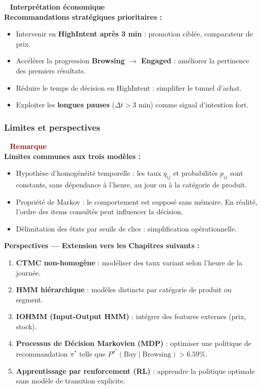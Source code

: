 \documentclass[11pt,a4paper]{article}
\newenvironment{insightbox}{%
  \vspace{3pt}\begin{framed}
  \noindent{\color{NavyBlue}\rule{0.3cm}{3pt}}~%
  \textcolor{NavyBlue}{\textbf{Interprétation économique}}\\[3pt]}
  {\end{framed}\vspace{3pt}}
\newenvironment{warnbox}{%
  \vspace{3pt}\begin{framed}
  \noindent{\color{DarkRed}\rule{0.3cm}{3pt}}~%
  \textcolor{DarkRed}{\textbf{Remarque}}\\[3pt]}
  {\end{framed}\vspace{3pt}}
\begin{document}
\begin{insightbox}
\textbf{Recommandations stratégiques prioritaires :}
\begin{itemize}[leftmargin=1.5cm,itemsep=2pt]
  \item Intervenir en \textbf{HighIntent après 3 min} : promotion ciblée, comparateur de prix.
  \item Accélérer la progression \textbf{Browsing $\to$ Engaged} : améliorer la pertinence des premiers résultats.
  \item Réduire le temps de décision en HighIntent : simplifier le tunnel d'achat.
  \item Exploiter les \textbf{longues pauses} ($\Delta t > 3$ min) comme signal d'intention fort.
\end{itemize}
\end{insightbox}

\subsubsection{Limites et perspectives}

\begin{warnbox}
\textbf{Limites communes aux trois modèles :}
\begin{itemize}[leftmargin=1.5cm,itemsep=2pt]
  \item Hypothèse d'homogénéité temporelle : les taux $q_{ij}$ et probabilités $p_{ij}$
  sont constants, sans dépendance à l'heure, au jour ou à la catégorie de produit.
  \item Propriété de Markov : le comportement est supposé sans mémoire.
  En réalité, l'ordre des items consultés peut influencer la décision.
  \item Délimitation des états par seuils de clics : simplification opérationnelle.
\end{itemize}
\end{warnbox}

\begin{perspBox}
\textbf{Perspectives --- Extension vers les Chapitres suivants :}
\begin{enumerate}[leftmargin=1.5cm,itemsep=2pt]
  \item \textbf{CTMC non-homogène} : modéliser des taux variant selon l'heure de la journée.
  \item \textbf{HMM hiérarchique} : modèles distincts par catégorie de produit ou segment.
  \item \textbf{IOHMM (Input-Output HMM)} : intégrer des features externes (prix, stock).
  \item \textbf{Processus de Décision Markovien (MDP)} : optimiser une politique de recommandation
  $\pi^*$ telle que $P^{\pi^*}(\text{Buy} \mid \text{Browsing}) > 6.59\%$.
  \item \textbf{Apprentissage par renforcement (RL)} : apprendre la politique optimale
  sans modèle de transition explicite.
\end{enumerate}
\end{perspBox}
\end{document}
